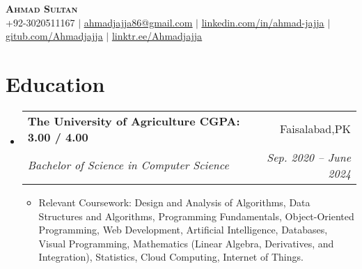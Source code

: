 \documentclass[letterpaper,11pt]{article}
\makeatletter
\newcommand{\resumeItem}[1]{
  \item\small{
    {#1 \vspace{-2pt}}
  }
}
\newcommand{\resumeSubheading}[4]{
  \vspace{-2pt}\item
    \begin{tabular*}{0.97\textwidth}[t]{l@{\extracolsep{\fill}}r}
      \textbf{#1} & #2 \\
      \textit{\small#3} & \textit{\small #4} \\
    \end{tabular*}\vspace{-7pt}
}
\newcommand{\resumeSubHeadingListStart}{\begin{itemize}[leftmargin=0.15in, label={}]}
\newcommand{\resumeSubHeadingListEnd}{\end{itemize}}
\newcommand{\resumeItemListStart}{\begin{itemize}}
\newcommand{\resumeItemListEnd}{\end{itemize}\vspace{-5pt}}
\makeatother
\begin{document}

\begin{center}
  \textbf{\Huge \scshape Ahmad Sultan} \\ \vspace{1pt}
  \small +92-3020511167 $|$
  \href{mailto:ahmadjajja86@gmail.com}{\underline{ahmadjajja86@gmail.com}} $|$
  \href{https://www.linkedin.com/in/ahmad-jajja/}{\underline{linkedin.com/in/ahmad-jajja}} $|$
  \href{https://github.com/Ahmadjajja}{\underline{gitub.com/Ahmadjajja}} $|$
  \href{https://linktr.ee/Ahmadjajja}{\underline{linktr.ee/Ahmadjajja}}
\end{center}

\section{Education}
\resumeSubHeadingListStart
\resumeSubheading
{The University of Agriculture \hspace{3.5cm} CGPA: 3.00 / 4.00}{Faisalabad,PK}
{Bachelor of Science in Computer Science}{Sep. 2020 -- June 2024}
\resumeItemListStart
\resumeItem{Relevant Coursework: Design and Analysis of Algorithms, Data Structures and Algorithms, Programming Fundamentals, Object-Oriented Programming, Web Development, Artificial Intelligence, Databases, Visual Programming, Mathematics (Linear Algebra, Derivatives, and Integration), Statistics, Cloud Computing, Internet of Things.}
\resumeItemListEnd
\resumeSubHeadingListEnd
%
\end{document}
